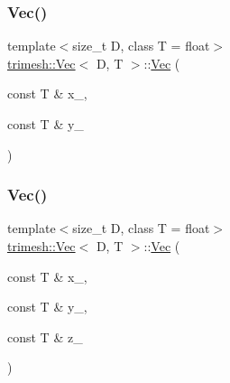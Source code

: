 \mbox{\label{classtrimesh_1_1Vec_a1dae33ffc1c803c1a62e74e5324c5915}} 
\subsubsection{\texorpdfstring{Vec()}{Vec()}\hspace{0.1cm}{\footnotesize\ttfamily [3/7]}}
{\footnotesize\ttfamily template$<$size\+\_\+t D, class T = float$>$ \\
\hyperlink{classtrimesh_1_1Vec}{trimesh\+::\+Vec}$<$ D, T $>$\+::\hyperlink{classtrimesh_1_1Vec}{Vec} (\begin{DoxyParamCaption}\item[{const T \&}]{x\+\_\+,  }\item[{const T \&}]{y\+\_\+ }\end{DoxyParamCaption})\hspace{0.3cm}{\ttfamily [inline]}}

\mbox{\label{classtrimesh_1_1Vec_a02fe2d006465f953933051fc0b63d218}} 
\subsubsection{\texorpdfstring{Vec()}{Vec()}\hspace{0.1cm}{\footnotesize\ttfamily [4/7]}}
{\footnotesize\ttfamily template$<$size\+\_\+t D, class T = float$>$ \\
\hyperlink{classtrimesh_1_1Vec}{trimesh\+::\+Vec}$<$ D, T $>$\+::\hyperlink{classtrimesh_1_1Vec}{Vec} (\begin{DoxyParamCaption}\item[{const T \&}]{x\+\_\+,  }\item[{const T \&}]{y\+\_\+,  }\item[{const T \&}]{z\+\_\+ }\end{DoxyParamCaption})\hspace{0.3cm}{\ttfamily [inline]}}

\mbox{\label{classtrimesh_1_1Vec_ab03d990467a77e1b8fe1932b20d5daab}} 
